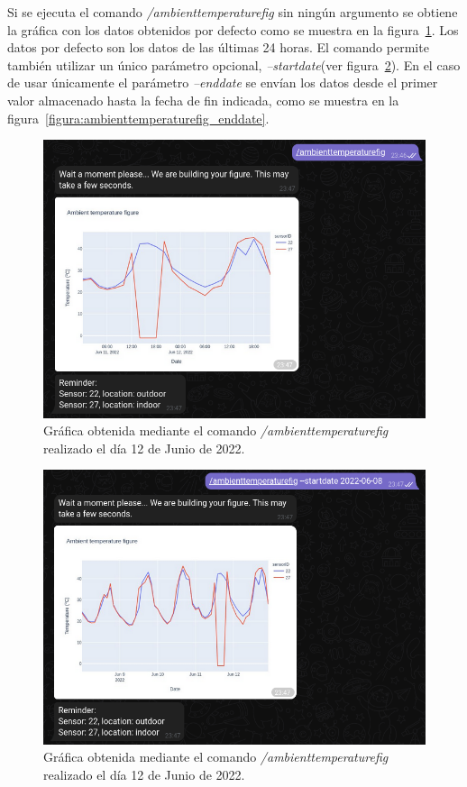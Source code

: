 \documentclass[a4paper, 12pt, oneside]{book}
\begin{document}
Si se ejecuta el comando \textit{/ambienttemperaturefig} sin ningún argumento se obtiene la gráfica con los datos obtenidos por defecto como se muestra en la figura~\ref{figura:ambienttemperaturefig}. Los datos por defecto son los datos de las últimas 24 horas. El comando permite también utilizar un único parámetro opcional, \textit{--startdate}(ver figura~\ref{figura:ambienttemperaturefig_startdate}). En el caso de usar únicamente el parámetro \textit{--enddate} se envían los datos desde el primer valor almacenado hasta la fecha de fin indicada, como se muestra en la figura~\ref{figura:ambienttemperaturefig_enddate}.

\begin{figure}[H]
	\centering
    \includegraphics[width=12cm, keepaspectratio]{img/ambienttemperaturefig}
    \caption{Gráfica obtenida mediante el comando \textit{/ambienttemperaturefig} realizado el día 12 de Junio de 2022.}
    \label{figura:ambienttemperaturefig}
\end{figure}

\begin{figure}[H]
	\centering
    \includegraphics[width=12cm, keepaspectratio]{img/ambienttemperaturefig_startdate}
    \caption{Gráfica obtenida mediante el comando \textit{/ambienttemperaturefig} realizado el día 12 de Junio de 2022.}
    \label{figura:ambienttemperaturefig_startdate}
\end{figure}
\end{document}
